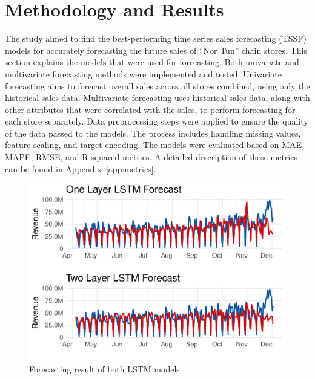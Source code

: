 \documentclass[conference]{IEEEtran}
\begin{document}
\section{Methodology and Results}
The study aimed to find the best-performing time series sales forecasting (TSSF) models for accurately forecasting the future sales of ``Nor Tun'' chain stores. This section explains the models that were used for forecasting. Both univariate and multivariate forecasting methods were implemented and tested. Univariate forecasting aims to forecast overall sales across all stores combined, using only the historical sales data. Multivariate forecasting uses historical sales data, along with other attributes that were correlated with the sales, to perform forecasting for each store separately. Data preprocessing steps were applied to ensure the quality of the data passed to the models. The process includes handling missing values, feature scaling, and target encoding. The models were evaluated based on MAE, MAPE, RMSE, and R-squared metrics. A detailed description of these metrics can be found in Appendix~\autoref{app:metrics}.




\begin{figure}[htbp]
\centering
\includegraphics[width=\columnwidth,keepaspectratio]{./figures/lstm_predictions.pdf}
\caption{Forecasting result of both LSTM models \cite{lstmforecast}}
\label{fig:lstm_predictions}
\end{figure}
\end{document}
